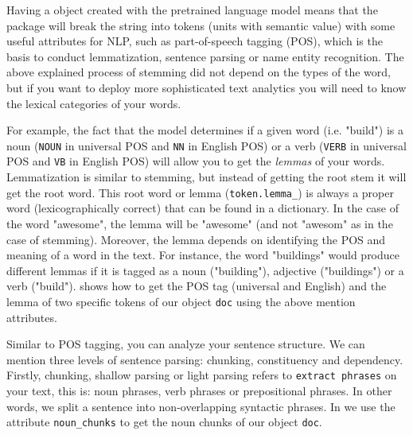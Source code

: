 
Having a  object created with the pretrained language model means that the package will break the string into tokens (units with semantic value) with some useful attributes for NLP, such as part-of-speech tagging (POS), which is the basis to conduct lemmatization, sentence parsing or name entity recognition. The above explained process of stemming did not depend on the types of the word, but if you want to deploy more sophisticated text analytics you will need to know the lexical categories of your words. 




For example, the fact that the model determines if a given word (i.e. "build") is a noun (\texttt{NOUN} in universal POS and \texttt{NN} in English POS) or a verb (\texttt{VERB} in universal POS and \texttt{VB} in English POS) will allow you to get the \textit{lemmas} of your words. Lemmatization is similar to stemming, but instead of getting the root stem it will get the root word. This root word or lemma (\verb|token.lemma_|) is always a proper word (lexicographically correct) that can be found in a dictionary. In the case of the word "awesome", the lemma will be "awesome" (and not "awesom" as in the case of stemming). Moreover, the lemma depends on identifying the POS and meaning of a word in the text. For instance, the word "buildings" would produce different lemmas if it is tagged as a noun ("building"), adjective ("buildings") or a verb ("build").  shows how to get the POS tag (universal and English) and the lemma of two specific tokens of our object \texttt{doc} using the above mention attributes.


Similar to POS tagging, you can analyze your sentence structure. We can mention three levels of sentence parsing: chunking, constituency and dependency. Firstly, chunking, shallow parsing or light parsing refers to \texttt{extract phrases} on your text, this is: noun phrases, verb phrases or prepositional phrases.  In other words, we split a sentence into non-overlapping syntactic phrases. In  we use the attribute \verb|noun_chunks| to get the noun chunks of our  object \texttt{doc}.

